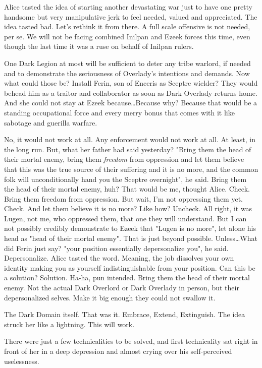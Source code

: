 Alice tasted the idea of starting another devastating war just to have one pretty handsome but very manipulative jerk to feel needed, valued and appreciated. The idea tasted bad. Let's rethink it from there. A full scale offensive is not needed, per se. We will not be facing combined Inilpan and Ezeek forces this time, even though the last time it was a ruse on behalf of Inilpan rulers.

One Dark Legion at most will be sufficient to deter any tribe warlord, if needed and to demonstrate the seriousness of Overlady's intentions and demands. Now what could those be? Install Ferin, son of Enceris as Sceptre wielder? They would behead him as a traitor and collaborator as soon as Dark Overlady returns home. And she could not stay at Ezeek because\dots Because why? Because that would be a standing occupational force and every merry bonus that comes with it like sabotage and guerilla warfare.

No, it would not work at all. Any enforcement would not work at all. At least, in the long run. But, what her father had said yesterday? "Bring them the head of their mortal enemy, bring them \textit{freedom} from oppression and let them believe that this was the true source of their suffering and it is no more, and the common folk will unconditionally hand you the Sceptre overnight", he said. Bring them the head of their mortal enemy, huh? That would be me, thought Alice. Check. Bring them freedom from oppression. But wait, I'm not oppressing them yet. Check. And let them believe it is no more? Like how? Uncheck. All right, it was Lugen, not me, who oppressed them, that one they will understand. But I can not possibly credibly demonstrate to Ezeek that "Lugen is no more", let alone his head as "head of their mortal enemy". That is just beyond possible. Unless\dots What did Ferin just say? "your position essentially depersonalize you", he said. Depersonalize. Alice tasted the word. Meaning, the job dissolves your own identity making you as yourself indistinguishable from your position. Can this be a solution? Solution. Ha-ha, pun intended. Bring them the head of their mortal enemy. Not the actual Dark Overlord or Dark Overlady in person, but their depersonalized selves. Make it big enough they could not swallow it. 

The Dark Domain itself. That was it. Embrace, Extend, Extinguish. The idea struck her like a lightning. This will work.

There were just a few technicalities to be solved, and first technicality sat right in front of her in a deep depression and almost crying over his self-perceived uselessness.

